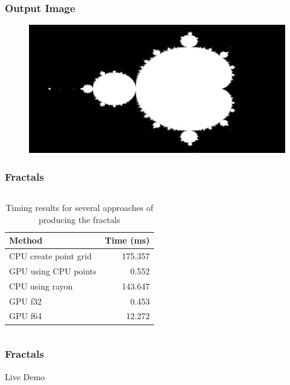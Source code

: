\documentclass[aspectratio=169]{beamer}
\begin{document}
\begin{frame}
	\frametitle{Output Image}
	\begin{figure}[H]
		\centering
		\includegraphics[width=\textwidth]{./figures/mandelbrot.png}
	\end{figure}
\end{frame}

\begin{frame}
	\frametitle{Fractals}

	\begin{columns}
		\begin{column}{0.5\textwidth}
			\begin{table}[ht]
				\centering
				\caption{Timing results for several approaches of producing the fractals}
				\begin{tabular}{l r}
					\toprule
					Method                & Time (ms) \\
					\midrule
					CPU create point grid & 175.357   \\
					GPU using CPU points  & 0.552     \\
					CPU using rayon       & 143.647   \\
					\midrule
					GPU f32               & 0.453     \\
					GPU f64               & 12.272    \\
					\bottomrule
				\end{tabular}
			\end{table}
		\end{column}
	\end{columns}
\end{frame}

\begin{frame}
	\frametitle{Fractals}

	\centering
	\huge Live Demo
\end{frame}

\printbibliography
\end{document}
